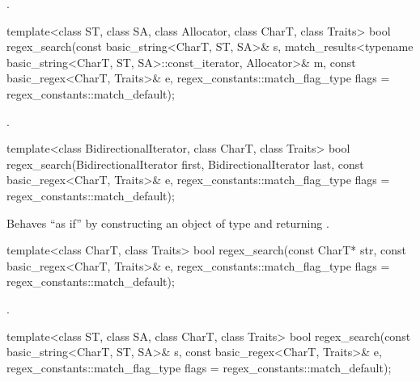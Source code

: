 \begin{itemdescr}
\pnum
\returns
{}.
\end{itemdescr}

%
\begin{itemdecl}
template<class ST, class SA, class Allocator, class CharT, class Traits>
  bool regex_search(const basic_string<CharT, ST, SA>& s,
                    match_results<typename basic_string<CharT, ST, SA>::const_iterator,
                                  Allocator>& m,
                    const basic_regex<CharT, Traits>& e,
                    regex_constants::match_flag_type flags = regex_constants::match_default);
\end{itemdecl}

\begin{itemdescr}
\pnum
\returns
{}.
\end{itemdescr}

%
\begin{itemdecl}
template<class BidirectionalIterator, class CharT, class Traits>
  bool regex_search(BidirectionalIterator first, BidirectionalIterator last,
                    const basic_regex<CharT, Traits>& e,
                    regex_constants::match_flag_type flags = regex_constants::match_default);
\end{itemdecl}

\begin{itemdescr}
\pnum
\effects
Behaves ``as if'' by constructing an object 
of type  and returning
.
\end{itemdescr}

%
\begin{itemdecl}
template<class CharT, class Traits>
  bool regex_search(const CharT* str,
                    const basic_regex<CharT, Traits>& e,
                    regex_constants::match_flag_type flags = regex_constants::match_default);
\end{itemdecl}

\begin{itemdescr}
\pnum
\returns
{}.
\end{itemdescr}

%
\begin{itemdecl}
template<class ST, class SA, class CharT, class Traits>
  bool regex_search(const basic_string<CharT, ST, SA>& s,
                    const basic_regex<CharT, Traits>& e,
                    regex_constants::match_flag_type flags = regex_constants::match_default);
\end{itemdecl}


